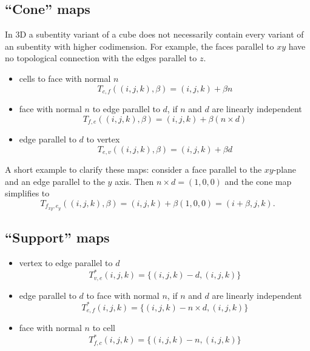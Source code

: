 \documentclass[a4paper,11pt]{article}
\begin{document}
\subsection{``Cone'' maps}
\label{sec:cone-maps}

In 3D a subentity variant of a cube does not necessarily contain every variant
of an subentity with higher codimension. For example, the faces parallel to $xy$
have no topological connection with the edges parallel to $z$.
\begin{itemize}
\item cells to face with normal $n$
  \begin{equation}
    \label{eq:block-cell-face}
    T_{c,f}((i,j,k), \beta) = (i, j, k) + \beta n
  \end{equation}
\item face with normal $n$ to edge parallel to $d$, if $n$ and $d$ are
  linearly independent
  \begin{equation}
    \label{eq:block-face-edge}
    T_{f,e} ((i,j,k), \beta) = (i, j, k) + \beta (n\times d)
  \end{equation}
\item edge parallel to $d$ to vertex
  \begin{equation}
    \label{eq:block-edge-vertex}
    T_{e,v} ((i,j,k), \beta) = (i, j, k) + \beta d
  \end{equation}
\end{itemize}

A short example to clarify these maps: consider a face parallel to the
$xy$-plane and an edge parallel to the $y$ axis. Then $n \times d = (1,0,0)$ and
the cone map simplifies to
\begin{equation}
  \label{eq:block-fxy-ey}
  T_{f_{xy},e_y} ((i,j,k), \beta) = (i,j,k) + \beta (1,0,0) = (i + \beta, j, k).
\end{equation}

\subsection{``Support'' maps}
\label{sec:support-maps}
\begin{itemize}
\item vertex to edge parallel to $d$
  \begin{equation}
    \label{eq:block-vertex-edge}
    T^*_{v,e} (i,j,k) = \{(i,j,k) - d, (i,j,k)\}
  \end{equation}
\item edge parallel to $d$ to face with normal $n$, if $n$ and $d$ are
  linearly independent
  \begin{equation}
    \label{eq:block-edge-face}
    T^*_{e,f} (i,j,k) = \{(i,j,k) - n\times d, (i,j,k)\}
  \end{equation}
\item face with normal $n$ to cell
    \begin{equation}
    \label{eq:block-face-cell}
    T^*_{f,c} (i,j,k) = \{(i,j,k) - n, (i,j,k)\}
  \end{equation}
\end{itemize}
\end{document}
